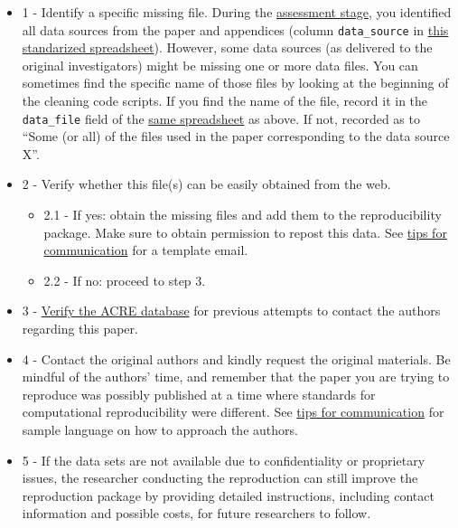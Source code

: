 \documentclass[]{book}
\providecommand{\tightlist}{%
  \setlength{\itemsep}{0pt}\setlength{\parskip}{0pt}}
\begin{document}
\begin{itemize}
\tightlist
\item
  1 - Identify a specific missing file. During the \protect\hyperlink{assessment}{assessment stage}, you identified all data sources from the paper and appendices (column \texttt{data\_source} in \href{https://docs.google.com/spreadsheets/d/1LUIdVFH0OfR70C7z07TYeE-uWzKI_JIeWUMaYhqEKK0/edit\#gid=0\&range=A1}{this standarized spreadsheet}). However, some data sources (as delivered to the original investigators) might be missing one or more data files. You can sometimes find the specific name of those files by looking at the beginning of the cleaning code scripts. If you find the name of the file, record it in the \texttt{data\_file} field of the \href{https://docs.google.com/spreadsheets/d/1LUIdVFH0OfR70C7z07TYeE-uWzKI_JIeWUMaYhqEKK0/edit\#gid=0\&range=A1}{same spreadsheet} as above. If not, recorded as to ``Some (or all) of the files used in the paper corresponding to the data source X''.\\
\item
  2 - Verify whether this file(s) can be easily obtained from the web.

  \begin{itemize}
  \tightlist
  \item
    2.1 - If yes: obtain the missing files and add them to the reproducibility package. Make sure to obtain permission to repost this data. See \protect\hyperlink{tips-for-communication}{tips for communication} for a template email.\\
  \item
    2.2 - If no: proceed to step 3.\\
  \end{itemize}
\item
  3 - \href{ADD\%20LINK}{Verify the ACRE database} for previous attempts to contact the authors regarding this paper.\\
\item
  4 - Contact the original authors and kindly request the original materials. Be mindful of the authors' time, and remember that the paper you are trying to reproduce was possibly published at a time where standards for computational reproducibility were different. See \protect\hyperlink{tips-for-communication}{tips for communication} for sample language on how to approach the authors.\\
\item
  5 - If the data sets are not available due to confidentiality or proprietary issues, the researcher conducting the reproduction can still improve the reproduction package by providing detailed instructions, including contact information and possible costs, for future researchers to follow.
\end{itemize}
\end{document}
